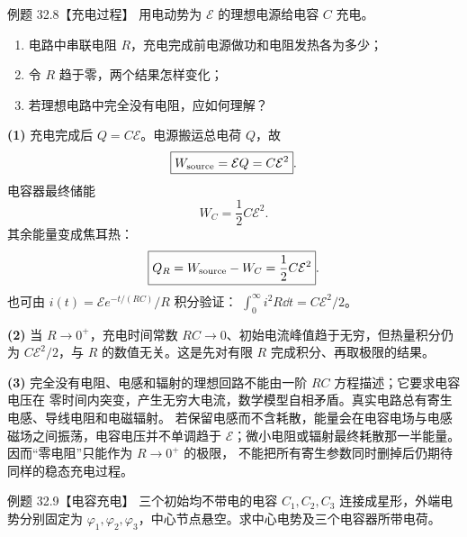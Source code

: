 \Needspace{0.4\textheight}
\begin{origexamplebox}{例题 32.8【充电过程】}
用电动势为 $\mathcal E$ 的理想电源给电容 $C$ 充电。
\begin{enumerate}[label=(\arabic*),leftmargin=2.2em]
  \item 电路中串联电阻 $R$，充电完成前电源做功和电阻发热各为多少；
  \item 令 $R$ 趋于零，两个结果怎样变化；
  \item 若理想电路中完全没有电阻，应如何理解？
\end{enumerate}
\end{origexamplebox}

\begin{xesolution}
\textbf{(1)} 充电完成后 $Q=C\mathcal E$。电源搬运总电荷 $Q$，故
\begin{equation}
  \boxed{W_{\rm source}=\mathcal EQ=C\mathcal E^2}.
\end{equation}
电容器最终储能
\[
  W_C=\frac12C\mathcal E^2.
\]
其余能量变成焦耳热：
\begin{equation}
  \boxed{Q_R=W_{\rm source}-W_C=\frac12C\mathcal E^2}.
\end{equation}
也可由 $i(t)=\mathcal E e^{-t/(RC)}/R$ 积分验证：
$\int_0^\infty i^2R\dd t=C\mathcal E^2/2$。

\textbf{(2)} 当 $R\to0^+$，充电时间常数 $RC\to0$、初始电流峰值趋于无穷，但热量积分仍为
$C\mathcal E^2/2$，与 $R$ 的数值无关。这是先对有限 $R$ 完成积分、再取极限的结果。

\textbf{(3)} 完全没有电阻、电感和辐射的理想回路不能由一阶 $RC$ 方程描述；它要求电容电压在
零时间内突变，产生无穷大电流，数学模型自相矛盾。真实电路总有寄生电感、导线电阻和电磁辐射。
若保留电感而不含耗散，能量会在电容电场与电感磁场之间振荡，电容电压并不单调趋于
$\mathcal E$；微小电阻或辐射最终耗散那一半能量。因而“零电阻”只能作为 $R\to0^+$ 的极限，
不能把所有寄生参数同时删掉后仍期待同样的稳态充电过程。

\chargingDiagram
\end{xesolution}

\Needspace{0.38\textheight}
\begin{origexamplebox}{例题 32.9【电容充电】}
三个初始均不带电的电容 $C_1,C_2,C_3$ 连接成星形，外端电势分别固定为
$\varphi_1,\varphi_2,\varphi_3$，中心节点悬空。求中心电势及三个电容器所带电荷。
\end{origexamplebox}

